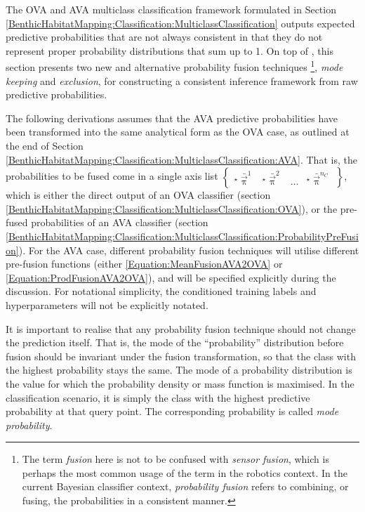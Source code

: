 				The OVA and AVA multiclass classification framework formulated in Section \ref{BenthicHabitatMapping:Classification:MulticlassClassification} outputs expected predictive probabilities that are not always consistent in that they do not represent proper probability distributions that sum up to 1. On top of , this section presents two new and alternative probability fusion techniques \footnote{The term \textit{fusion} here is not to be confused with \textit{sensor fusion}, which is perhaps the most common usage of the term in the robotics context. In the current Bayesian classifier context, \textit{probability fusion} refers to combining, or fusing, the probabilities in a consistent manner.}, \textit{mode keeping} and \textit{exclusion}, for constructing a consistent inference framework from raw predictive probabilities.
				
				The following derivations assumes that the AVA predictive probabilities have been transformed into the same analytical form as the OVA case, as outlined at the end of Section \ref{BenthicHabitatMapping:Classification:MulticlassClassification:AVA}. That is, the probabilities to be fused come in a single axis list $\begin{Bmatrix*} {^{\star}}\bar{\vec{\uppi}}^{1} & {^{\star}}\bar{\vec{\uppi}}^{2} & \dots & {^{\star}}\bar{\vec{\uppi}}^{n_{C}} \end{Bmatrix*}$, which is either the direct output of an OVA classifier (section \ref{BenthicHabitatMapping:Classification:MulticlassClassification:OVA}), or the pre-fused probabilities of an AVA classifier (section \ref{BenthicHabitatMapping:Classification:MulticlassClassification:ProbabilityPreFusion}). For the AVA case, different probability fusion techniques will utilise different pre-fusion functions (either \eqref{Equation:MeanFusionAVA2OVA} or \eqref{Equation:ProdFusionAVA2OVA}), and will be specified explicitly during the discussion. For notational simplicity, the conditioned training labels and hyperparameters will not be explicitly notated.
			
				It is important to realise that any probability fusion technique should not change the prediction itself. That is, the mode of the ``probability'' distribution before fusion should be invariant under the fusion transformation, so that the class with the highest probability stays the same. The mode of a probability distribution is the value for which the probability density or mass function is maximised. In the classification scenario, it is simply the class with the highest predictive probability at that query point. The corresponding probability is called \textit{mode probability}.
					
